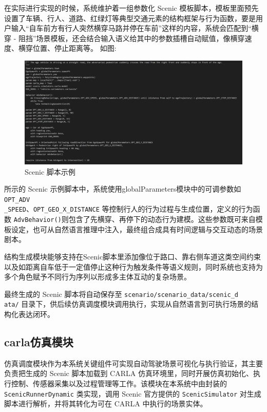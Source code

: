 在实际进行实现的时候，系统维护着一组参数化 Scenic 模板脚本，模板里面预先设置了车辆、行人、道路、红绿灯等典型交通元素的结构框架与行为函数，要是用户输入“自车前方有行人突然横穿马路并停在车前”这样的内容，系统会匹配到“横穿 - 阻挡”场景模板，还会结合输入语义给其中的参数插槽自动赋值，像横穿速度、横穿位置、停止距离等。
如图:
\begin{figure}[H]
	\centering
	\includegraphics[width=1.0\textwidth]{images/scenic脚本示例1.png}
	\caption{Scenic 脚本示例}
	\label{fig:scenic-example1}
\end{figure}



所示的 Scenic 示例脚本中，系统使用globalParameters模块中的可调参数如
\texttt{OPT\_ADV\\ \_SPEED}、\texttt{OPT\_GEO\_X\_DISTANCE} 等控制行人的行为过程与生成位置，定义的行为函数 \texttt{AdvBehavior()}则包含了先横穿、再停下的动态行为建模。这些参数既可来自模板设定，也可从自然语言推理中注入，最终组合成具有时间逻辑与交互动态的场景剧本。

结构生成模块能够支持在Scenic脚本里添加像位于路口、靠右侧车道这类空间约束以及如距离自车低于一定值停止这种行为触发条件等语义规则，同时系统也支持为多个角色赋予不同行为序列以形成多主体互动的复杂场景。

最终生成的 Scenic 脚本将自动保存至 \texttt{scenario/scenario\_data/scenic\_d\\ata/} 目录下，供后续仿真调度模块调用执行，实现从自然语言到可执行场景的结构化表达闭环。

\subsection{carla仿真模块}

仿真调度模块作为本系统关键组件可实现自动驾驶场景可视化与执行验证，其主要负责把生成的 Scenic 脚本加载到 CARLA 仿真环境里，同时开展仿真初始化、执行控制、传感器采集以及过程管理等工作。该模块在本系统中由封装的 \texttt{ScenicRunnerDynamic} 类实现，调用 Scenic 官方提供的 \texttt{ScenicSimulator} 对生成脚本进行解析，并将其转化为可在 CARLA 中执行的场景实体。

